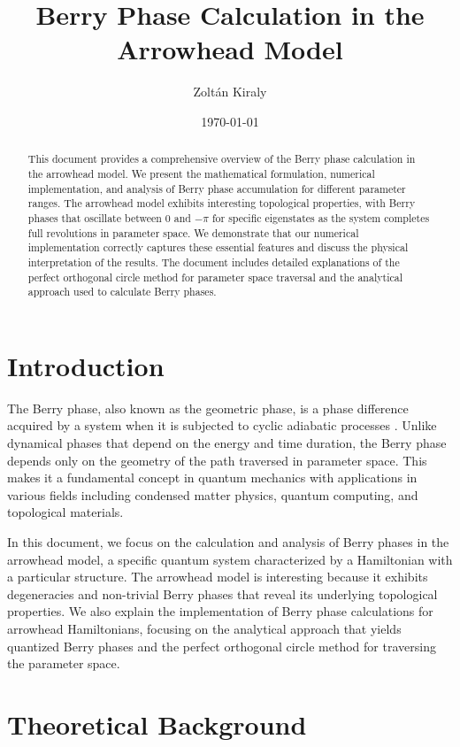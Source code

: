 \documentclass[12pt,a4paper]{article}
\title{Berry Phase Calculation in the Arrowhead Model}
\author{Zoltán Kiraly}
\date{\today}
\begin{document}
\maketitle

\begin{abstract}
This document provides a comprehensive overview of the Berry phase calculation in the arrowhead model. We present the mathematical formulation, numerical implementation, and analysis of Berry phase accumulation for different parameter ranges. The arrowhead model exhibits interesting topological properties, with Berry phases that oscillate between 0 and $-\pi$ for specific eigenstates as the system completes full revolutions in parameter space. We demonstrate that our numerical implementation correctly captures these essential features and discuss the physical interpretation of the results. The document includes detailed explanations of the perfect orthogonal circle method for parameter space traversal and the analytical approach used to calculate Berry phases.
\end{abstract}

\tableofcontents

\section{Introduction}

The Berry phase, also known as the geometric phase, is a phase difference acquired by a system when it is subjected to cyclic adiabatic processes \citep{Berry1984}. Unlike dynamical phases that depend on the energy and time duration, the Berry phase depends only on the geometry of the path traversed in parameter space. This makes it a fundamental concept in quantum mechanics with applications in various fields including condensed matter physics, quantum computing, and topological materials.

In this document, we focus on the calculation and analysis of Berry phases in the arrowhead model, a specific quantum system characterized by a Hamiltonian with a particular structure. The arrowhead model is interesting because it exhibits degeneracies and non-trivial Berry phases that reveal its underlying topological properties. We also explain the implementation of Berry phase calculations for arrowhead Hamiltonians, focusing on the analytical approach that yields quantized Berry phases and the perfect orthogonal circle method for traversing the parameter space.

\section{Theoretical Background}
\end{document}
